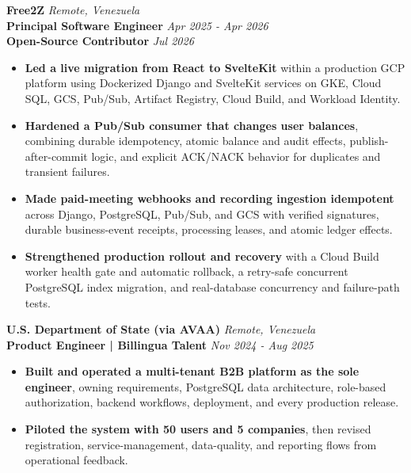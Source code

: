 \documentclass[10pt]{article}
\begin{document}
\vspace{2pt}
\textbf{Free2Z} \hfill \textit{Remote, Venezuela} \\
\textbf{Principal Software Engineer} \hfill \textit{Apr 2025 - Apr 2026} \\
\textbf{Open-Source Contributor} \hfill \textit{Jul 2026}
\begin{itemize}
    \item \textbf{Led a live migration from React to SvelteKit} within a production GCP platform using Dockerized Django and SvelteKit services on GKE, Cloud SQL, GCS, Pub/Sub, Artifact Registry, Cloud Build, and Workload Identity.
    \item \textbf{Hardened a Pub/Sub consumer that changes user balances}, combining durable idempotency, atomic balance and audit effects, publish-after-commit logic, and explicit ACK/NACK behavior for duplicates and transient failures.
    \item \textbf{Made paid-meeting webhooks and recording ingestion idempotent} across Django, PostgreSQL, Pub/Sub, and GCS with verified signatures, durable business-event receipts, processing leases, and atomic ledger effects.
    \item \textbf{Strengthened production rollout and recovery} with a Cloud Build worker health gate and automatic rollback, a retry-safe concurrent PostgreSQL index migration, and real-database concurrency and failure-path tests.
\end{itemize}

\vspace{2pt}
\textbf{U.S. Department of State (via AVAA)} \hfill \textit{Remote, Venezuela} \\
\textbf{Product Engineer | Billingua Talent} \hfill \textit{Nov 2024 - Aug 2025}
\begin{itemize}
    \item \textbf{Built and operated a multi-tenant B2B platform as the sole engineer}, owning requirements, PostgreSQL data architecture, role-based authorization, backend workflows, deployment, and every production release.
    \item \textbf{Piloted the system with 50 users and 5 companies}, then revised registration, service-management, data-quality, and reporting flows from operational feedback.
\end{itemize}
\end{document}
